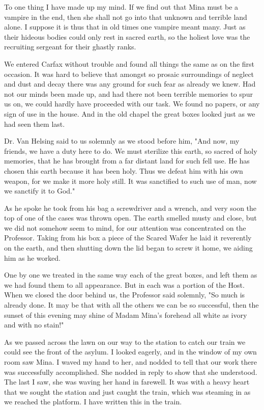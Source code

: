 To one thing I have made up my mind. If we find out that Mina must be a vampire in the end, then she shall not go into that unknown and terrible land alone. I suppose it is thus that in old times one vampire meant many. Just as their hideous bodies could only rest in sacred earth, so the holiest love was the recruiting sergeant for their ghastly ranks. 

We entered Carfax without trouble and found all things the same as on the first occasion. It was hard to believe that amongst so prosaic surroundings of neglect and dust and decay there was any ground for such fear as already we knew. Had not our minds been made up, and had there not been terrible memories to spur us on, we could hardly have proceeded with our task. We found no papers, or any sign of use in the house. And in the old chapel the great boxes looked just as we had seen them last. 

Dr. Van Helsing said to us solemnly as we stood before him, "And now, my friends, we have a duty here to do. We must sterilize this earth, so sacred of holy memories, that he has brought from a far distant land for such fell use. He has chosen this earth because it has been holy. Thus we defeat him with his own weapon, for we make it more holy still. It was sanctified to such use of man, now we sanctify it to God." 

As he spoke he took from his bag a screwdriver and a wrench, and very soon the top of one of the cases was thrown open. The earth smelled musty and close, but we did not somehow seem to mind, for our attention was concentrated on the Professor. Taking from his box a piece of the Scared Wafer he laid it reverently on the earth, and then shutting down the lid began to screw it home, we aiding him as he worked. 

One by one we treated in the same way each of the great boxes, and left them as we had found them to all appearance. But in each was a portion of the Host. When we closed the door behind us, the Professor said solemnly, "So much is already done. It may be that with all the others we can be so successful, then the sunset of this evening may shine of Madam Mina's forehead all white as ivory and with no stain!" 

As we passed across the lawn on our way to the station to catch our train we could see the front of the asylum. I looked eagerly, and in the window of my own room saw Mina. I waved my hand to her, and nodded to tell that our work there was successfully accomplished. She nodded in reply to show that she understood. The last I saw, she was waving her hand in farewell. It was with a heavy heart that we sought the station and just caught the train, which was steaming in as we reached the platform. I have written this in the train. 

